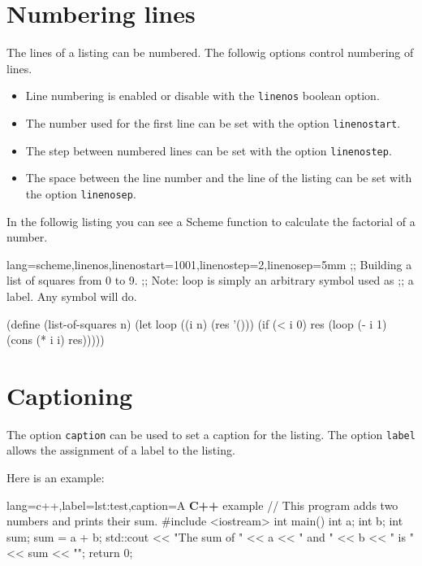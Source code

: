 \documentclass[10pt,a4paper]{article}
\begin{document}
\section{Numbering lines}

The lines of a listing can be numbered. The followig options control
numbering of lines.
\begin{itemize}
\item Line numbering is enabled or disable with the \verb|linenos|
boolean option.
\item The number used for the first line can be set with the option
\verb|linenostart|.
\item The step between numbered lines can be set with the option
\verb|linenostep|.
\item The space between the line number and the line of the listing
can be set with the option \verb|linenosep|.
\end{itemize}

In the followig listing you can see a Scheme function to calculate the
factorial of a number.

\begin{Example}
\begin{pygmented}{lang=scheme,linenos,linenostart=1001,linenostep=2,linenosep=5mm}
;; Building a list of squares from 0 to 9.
;; Note: loop is simply an arbitrary symbol used as
;; a label. Any symbol will do.

(define (list-of-squares n)
(let loop ((i n) (res '()))
(if (< i 0)
res
(loop (- i 1) (cons (* i i) res)))))
\end{pygmented}
\end{Example}

\section{Captioning}

The option \verb|caption| can be used to set a caption for the listing.
The option \verb|label| allows the assignment of a label to the listing.

Here is an example:

\begin{Example}
\begin{pygmented}{lang=c++,label=lst:test,caption=A \textbf{C++} example}
// This program adds two numbers and prints their sum.
#include <iostream>
int main()
{
int a;
int b;
int sum;
sum = a + b;
std::cout << "The sum of " << a << " and " << b
<< " is " << sum << "\n";
return 0;
}
\end{pygmented}
\end{Example}
\end{document}

